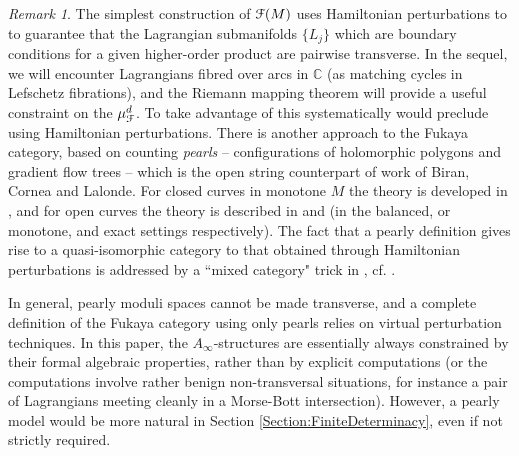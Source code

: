 \documentclass[reqno,10pt]{amsart}
\numberwithin{equation}{section}
\newcommand{\bC}{{\mathbb C}}
\newcommand{\scrF}{\EuScript{F}}
\theoremstyle{remark}
\newtheorem{Remark}[thm]{Remark}
\begin{document}
\begin{Remark} \label{Rem:Pearls}
The simplest construction of $\scrF(M)$ uses Hamiltonian perturbations to to guarantee that the Lagrangian submanifolds $\{L_j\}$ which are boundary conditions for a  given higher-order product are pairwise transverse. In the sequel, we will encounter Lagrangians fibred over arcs in $\bC$ (as matching cycles in Lefschetz fibrations), and the Riemann mapping theorem will provide a useful constraint on the $\mu^d_{\scrF}$. To take advantage of this systematically would preclude using Hamiltonian perturbations.   There is another approach to the Fukaya category, based on counting \emph{pearls} -- configurations of holomorphic polygons and gradient flow trees -- which is the open string counterpart of work of Biran, Cornea and Lalonde.  For closed curves in monotone $M$ the theory is developed in \cite{BiranCornea}, and for open curves the theory is described in \cite[Section 7]{Seidel:HMSgenus2} and \cite[Section 4]{Sheridan} (in the balanced, or monotone, and exact settings respectively). The fact that a pearly definition gives rise to a quasi-isomorphic category to that obtained through Hamiltonian perturbations is addressed by a ``mixed category" trick in \cite[Section 4.8]{Sheridan}, cf. \cite[Section 10a]{FCPLT}. 

 In general, pearly moduli spaces cannot be made transverse, and a complete definition of the Fukaya category using only pearls relies on virtual perturbation techniques.  In this paper, the $A_{\infty}$-structures are essentially always constrained by their formal algebraic properties, rather than by explicit computations (or the computations involve rather benign non-transversal situations, for instance a pair of Lagrangians meeting cleanly in a Morse-Bott intersection). However, a pearly model would be more natural in Section \ref{Section:FiniteDeterminacy}, even if not strictly required. 
  \end{Remark}
\end{document}
